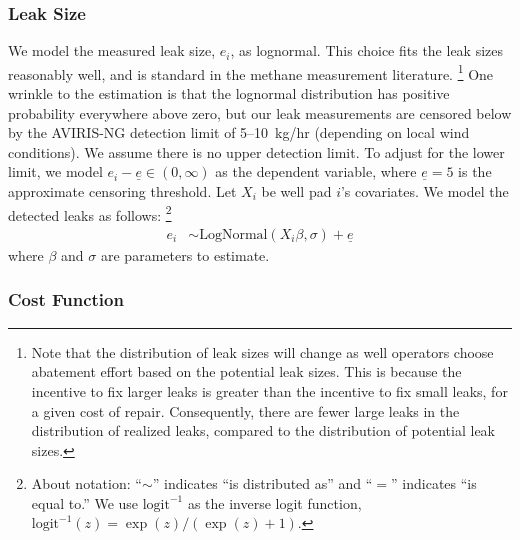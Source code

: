 \subsubsection{Leak Size}
We model the measured leak size, \(e_i\), as lognormal.
This choice fits the leak sizes reasonably well, and is standard in the methane measurement literature.%
\footnote{%
\label{fn:leak-size-distribution-change}
Note that the distribution of leak sizes will change as well operators choose abatement effort based on the potential leak sizes.
This is because the incentive to fix larger leaks is greater than the incentive to fix small leaks, for a given cost of repair.
Consequently, there are fewer large leaks in the distribution of realized leaks, compared to the distribution of potential leak sizes.
}
One wrinkle to the estimation is that the lognormal distribution has positive probability everywhere above zero, but our leak measurements are censored below by the \gls{AVIRIS-NG} detection limit of 5--10~kg/hr (depending on local wind conditions).
We assume there is no upper detection limit.
To adjust for the lower limit, we model \(e_i - \underline{e} \in (0, \infty)\) as the dependent variable, where \(\underline{e} = 5\) is the approximate censoring threshold.
Let \(X_i\) be well pad \(i\)'s covariates.
We model the detected leaks as follows:%
\footnote{%
About notation: ``\(\sim\)'' indicates ``is distributed as'' and ``\(=\)'' indicates ``is equal to.''
We use \(\text{logit}^{-1}\) as the inverse logit function,  \(\text{logit}^{-1}(z) = \exp(z) / (\exp(z) + 1)\).
}
\begin{align*}
e_i &\sim \text{LogNormal}(X_i \beta, \sigma) + \underline{e}
\end{align*}
where \(\beta\) and \(\sigma\) are parameters to estimate.

\subsubsection{Cost Function}

